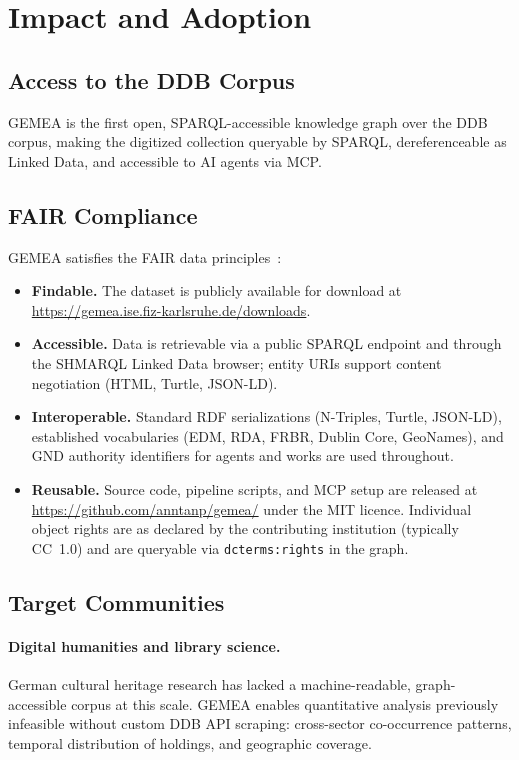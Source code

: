 
\section{Impact and Adoption}
\label{sec:impact}

\subsection{Access to the DDB Corpus}

GEMEA is the first open, SPARQL-accessible knowledge graph over the DDB corpus, making the digitized collection queryable by SPARQL, dereferenceable as Linked Data, and accessible to AI agents via MCP.

\subsection{FAIR Compliance}

GEMEA satisfies the FAIR data principles~\cite{wilkinson2016fair}:

\begin{itemize}
    \item \textbf{Findable.} The dataset is publicly available for download at \url{https://gemea.ise.fiz-karlsruhe.de/downloads}.
    \item \textbf{Accessible.} Data is retrievable via a public SPARQL endpoint and through the SHMARQL Linked Data browser; entity URIs support content negotiation (HTML, Turtle, JSON-LD).
    \item \textbf{Interoperable.} Standard RDF serializations (N-Triples, Turtle, JSON-LD), established vocabularies (EDM, RDA, FRBR, Dublin Core, GeoNames), and GND authority identifiers for agents and works are used throughout.
    \item \textbf{Reusable.} Source code, pipeline scripts, and MCP setup are released at \url{https://github.com/anntanp/gemea/} under the MIT licence. Individual object rights are as declared by the contributing institution (typically CC~1.0) and are queryable via \texttt{dcterms:rights} in the graph.
\end{itemize}

\subsection{Target Communities}

\paragraph{Digital humanities and library science.}
German cultural heritage research has lacked a machine-readable, graph-accessible corpus at this scale.
GEMEA enables quantitative analysis previously infeasible without custom DDB API scraping: cross-sector co-occurrence patterns, temporal distribution of holdings, and geographic coverage.

